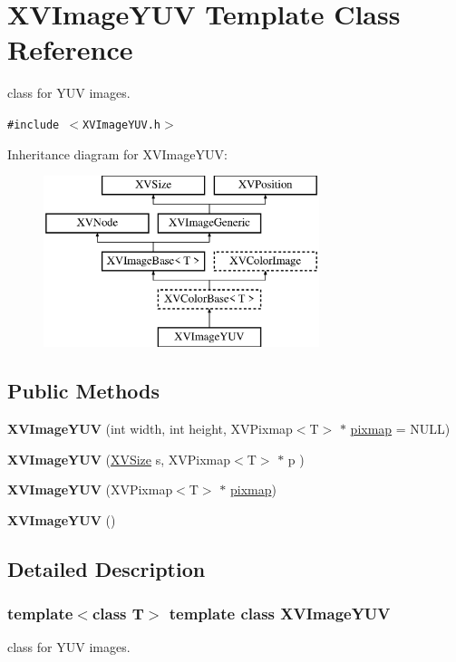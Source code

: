 \hypertarget{class_XVImageYUV}{
\section{XVImage\-YUV  Template Class Reference}
\label{XVImageYUV}
}
class for YUV images. 


{\tt \#include $<$XVImage\-YUV.h$>$}

Inheritance diagram for XVImage\-YUV:\begin{figure}[H]
\begin{center}
\leavevmode
\includegraphics[height=5cm]{class_XVImageYUV}
\end{center}
\end{figure}
\subsection*{Public Methods}
\begin{CompactItemize}
\item 
{\bf XVImage\-YUV} (int width, int height, XVPixmap$<$T$>$ $\ast$ \hyperlink{class_XVImageBase_n1}{pixmap} = NULL)
\item 
{\bf XVImage\-YUV} (\hyperlink{class_XVSize}{XVSize} s, XVPixmap$<$T$>$ $\ast$ p )
\item 
{\bf XVImage\-YUV} (XVPixmap$<$T$>$ $\ast$ \hyperlink{class_XVImageBase_n1}{pixmap})
\item 
{\bf XVImage\-YUV} ()
\end{CompactItemize}


\subsection{Detailed Description}
\subsubsection*{template$<$class T$>$  template class XVImage\-YUV}

class for YUV images.





